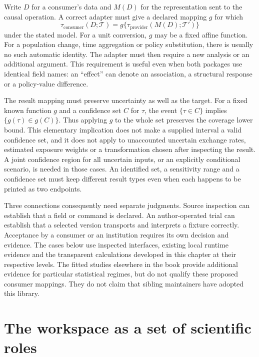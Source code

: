 Write $D$ for a consumer's data and $M(D)$ for the representation sent to the
causal operation. A correct adapter must give a declared mapping $g$ for which
\begin{equation}
 \tau_{\mathrm{consumer}}(D;\mathcal T)
   =g\{\tau_{\mathrm{provider}}(M(D);\mathcal T')\}
 \label{exec13:i3-target-map}
\end{equation}
under the stated model. For a unit conversion, $g$ may be a fixed affine
function. For a population change, time aggregation or policy substitution,
there is usually no such automatic identity. The adapter must then require a
new analysis or an additional argument. This requirement is useful even when
both packages use identical field names: an ``effect'' can denote an
association, a structural response or a policy-value difference.

The result mapping must preserve uncertainty as well as the target. For a
fixed known function $g$ and a confidence set $C$ for $\tau$, the event
$\{\tau\in C\}$ implies $\{g(\tau)\in g(C)\}$. Thus applying $g$ to the
whole set preserves the coverage lower bound. This elementary implication
does not make a supplied interval a valid confidence set, and it does not
apply to unaccounted uncertain exchange rates, estimated exposure weights or
a transformation chosen after inspecting the result. A joint confidence
region for all uncertain inputs, or an explicitly conditional scenario, is
needed in those cases. An identified set, a sensitivity range and a confidence
set must keep different result types even when each happens to be printed as
two endpoints.

Three connections consequently need separate judgments. Source inspection can
establish that a field or command is declared. An author-operated trial can
establish that a selected version transports and interprets a fixture
correctly. Acceptance by a consumer or an institution requires its own
decision and evidence. The cases below use inspected interfaces, existing
local runtime evidence and the transparent calculations developed in this chapter at their respective levels. The fitted studies elsewhere in the book provide additional evidence for particular statistical regimes, but do not qualify these proposed consumer mappings. They do not claim that sibling maintainers have adopted this library.

\section{The workspace as a set of scientific roles}

